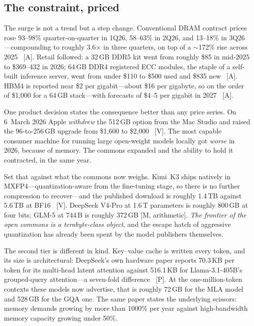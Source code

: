 \subsection{The constraint, priced}

The surge is not a trend but a step change. Conventional DRAM contract prices rose 93--98\% quarter-on-quarter in 1Q26, 58--63\% in 2Q26, and 13--18\% in 3Q26---compounding to roughly 3.6$\times$ in three quarters, on top of a $\sim$172\% rise across 2025~\cite{trendforce-dram} [A]. Retail followed: a 32\,GB DDR5 kit went from roughly \$85 in mid-2025 to \$369--432 in 2026; 64\,GB DDR4 registered ECC modules, the staple of a self-built inference server, went from under \$110 to \$500 used and \$835 new~\cite{dram-street} [A]. HBM4 is reported near \$2 per gigabit---about \$16 per gigabyte, so on the order of \$1{,}000 for a 64\,GB stack---with forecasts of \$4--5 per gigabit in 2027~\cite{hbm-pricing} [A].

One product decision states the consequence better than any price series. On 6~March 2026 Apple \emph{withdrew} the 512\,GB option from the Mac Studio and raised the 96-to-256\,GB upgrade from \$1{,}600 to \$2{,}000~\cite{mac-studio-512} [V]. The most capable consumer machine for running large open-weight models locally got \emph{worse} in 2026, because of memory. The commons expanded and the ability to hold it contracted, in the same year.

Set that against what the commons now weighs. Kimi~K3 ships natively in MXFP4---quantization-aware from the fine-tuning stage, so there is no further compression to recover---and the published download is roughly 1.4\,TB against 5.6\,TB at BF16~\cite{kimi-k3-card} [V]. DeepSeek V4-Pro at 1.6\,T parameters is roughly 800\,GB at four bits; GLM-5 at 744\,B is roughly 372\,GB [M, arithmetic]. \emph{The frontier of the open commons is a terabyte-class object}, and the escape hatch of aggressive quantization has already been spent by the model publishers themselves.

The second tier is different in kind. Key--value cache is written every token, and its size is architectural: DeepSeek's own hardware paper reports 70.3\,KB per token for its multi-head latent attention against 516.1\,KB for Llama-3.1-405B's grouped-query attention---a seven-fold difference~\cite{deepseek-hw} [P]. At the one-million-token contexts these models now advertise, that is roughly 72\,GB for the MLA model and 528\,GB for the GQA one. The same paper states the underlying scissors: memory demands growing by more than 1000\% per year against high-bandwidth memory capacity growing under 50\%.

